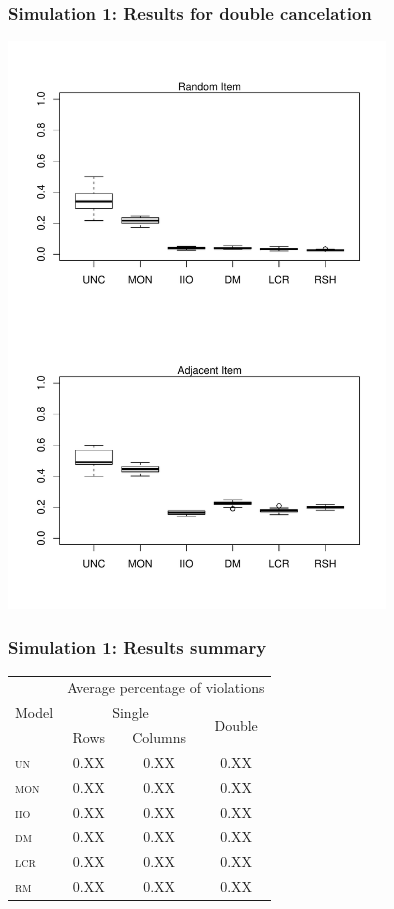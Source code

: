 \documentclass[10pt,serif,professionalfont]{beamer}
\begin{document}
\begin{frame}
    \frametitle{Simulation 1: Results for double cancelation}

    \centering \includegraphics[width=0.75\textwidth, clip, trim = 0 0 0 4.5in]{./figs/boxplots.pdf}

\end{frame}

\begin{frame}
    \frametitle{Simulation 1: Results summary}
    
    \begin{center}
    \begin{tabular}{lccc}
    \toprule
     \multirow{3}{*}{Model} & \multicolumn{3}{c}{Average percentage of violations} \\ \cmidrule(lr){2-4}
                & \multicolumn{2}{c}{Single} & \multirow{2}{*}{Double} \\ \cmidrule(lr){2-3}
                  & Rows       & Columns    &            \\
    \midrule
     \textsc{un}  & 0.XX & 0.XX & 0.XX \\
     \textsc{mon} & 0.XX & 0.XX & 0.XX \\
     \textsc{iio} & 0.XX & 0.XX & 0.XX \\
     \textsc{dm}  & 0.XX & 0.XX & 0.XX \\
     \textsc{lcr} & 0.XX & 0.XX & 0.XX \\
     \textsc{rm}  & 0.XX & 0.XX & 0.XX \\
    \bottomrule
    \end{tabular}
    \end{center}
    
\end{frame}
\end{document}
